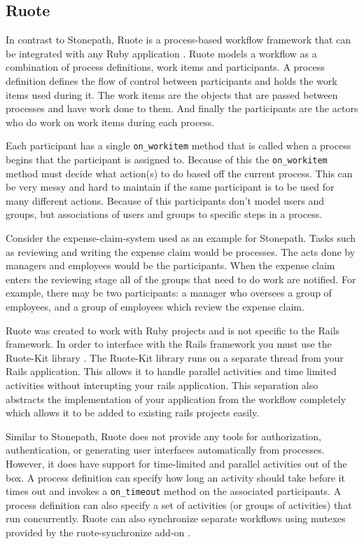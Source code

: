 \documentclass[document.tex]{subfiles}
\begin{document}
\subsection {Ruote}

In contrast to Stonepath, Ruote is a process-based workflow framework that can be integrated with any Ruby application \cite{ruote}. Ruote models a workflow as a combination of process definitions, work items and participants. A process definition defines the flow of control between participants and holds the work items used during it. The work items are the objects that are passed between processes and have work done to them. And finally the participants are the actors who do work on work items during each process. 

Each participant has a single \verb!on_workitem! method that is called when a process begins that the participant is assigned to. Because of this the \verb!on_workitem! method must decide what action(s) to do based off the current process. This can be very messy and hard to maintain if the same participant is to be used for many different actions. Because of this participants don't model users and groups, but associations of users and groups to specific steps in a process.

Consider the expense-claim-system used as an example for Stonepath. Tasks such as reviewing and writing the expense claim would be processes. The acts done by managers and employees would be the participants. When the expense claim enters the reviewing stage all of the groups that need to do work are notified. For example, there may be two participants: a manager who oversees a group of employees, and a group of employees which review the expense claim.

Ruote was created to work with Ruby projects and is not specific to the Rails framework. In order to interface with the Rails framework you must use the Ruote-Kit library \cite{ruote-kit}. The Ruote-Kit library runs on a separate thread from your Rails application. This allows it to handle parallel activities and time limited activities without interupting your rails application. This separation also abstracts the implementation of your application from the workflow completely which allows it to be added to existing rails projects easily.

Similar to Stonepath, Ruote does not provide any tools for authorization, authentication, or generating user interfaces automatically from processes. However, it does have support for time-limited and parallel activities out of the box. A process definition can specify how long an activity should take before it times out and invokes a \verb!on_timeout! method on the associated participants. A process definition can also specify a set of activities (or groups of activities) that run concurrently. Ruote can also synchronize separate workflows using mutexes provided by the ruote-synchronize add-on \cite{ruote-synchronize}.
\end{document}
